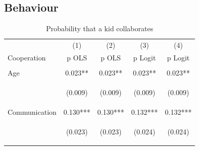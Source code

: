 \documentclass{article} %
\begin{document}
\subsection{Behaviour}
\begin{table}[H]
\caption{Probability that a kid collaborates} \label{tab:behav_results}

\begin{center}
\begin{tabular}{lcccc} \hline
 & (1) & (2) & (3) & (4) \\
Cooperation & p OLS & p OLS & p Logit & p Logit \\ \hline


\vspace{4pt} & \begin{footnotesize}\end{footnotesize} & \begin{footnotesize}\end{footnotesize} & \begin{footnotesize}\end{footnotesize} & \begin{footnotesize}\end{footnotesize} \\
Age & 0.023** & 0.023** & 0.023** & 0.023** \\
\vspace{4pt} & \begin{footnotesize}(0.009)\end{footnotesize} & \begin{footnotesize}(0.009)\end{footnotesize} & \begin{footnotesize}(0.009)\end{footnotesize} & \begin{footnotesize}(0.009)\end{footnotesize} \\
Communication & 0.130*** & 0.130*** & 0.132*** & 0.132*** \\
\vspace{4pt} & \begin{footnotesize}(0.023)\end{footnotesize} & \begin{footnotesize}(0.023)\end{footnotesize} & \begin{footnotesize}(0.024)\end{footnotesize} & \begin{footnotesize}(0.024)\end{footnotesize} \\

\end{tabular}
\end{center}
\end{table}
\end{document}
